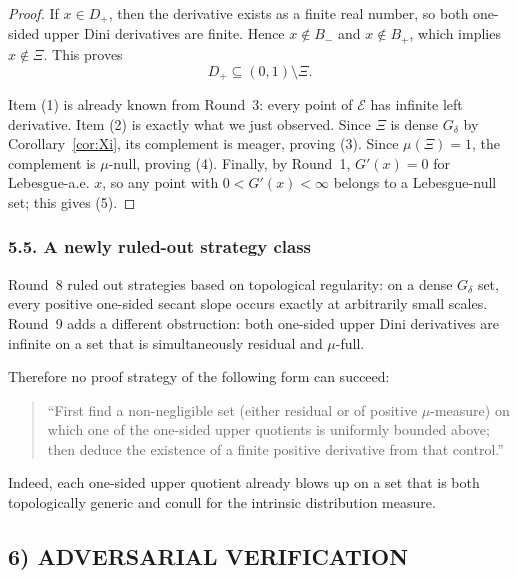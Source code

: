 \begin{proof}
If $x\in D_+$, then the derivative exists as a finite real number, so both one-sided upper Dini derivatives are finite.
Hence $x\notin B_-$ and $x\notin B_+$, which implies $x\notin \Xi$.
This proves
\[
D_+\subseteq (0,1)\setminus\Xi.
\]

Item (1) is already known from Round~3: every point of $\mathcal E$ has infinite left derivative.
Item (2) is exactly what we just observed.
Since $\Xi$ is dense $G_\delta$ by Corollary~\ref{cor:Xi}, its complement is meager, proving (3).
Since $\mu(\Xi)=1$, the complement is $\mu$-null, proving (4).
Finally, by Round~1, $G'(x)=0$ for Lebesgue-a.e. $x$, so any point with $0<G'(x)<\infty$ belongs to a Lebesgue-null set; this gives (5).
\end{proof}

\subsubsection*{5.5. A newly ruled-out strategy class}

Round~8 ruled out strategies based on topological regularity: on a dense $G_\delta$ set, every positive one-sided secant slope occurs exactly at arbitrarily small scales.
Round~9 adds a different obstruction: both one-sided upper Dini derivatives are infinite on a set that is simultaneously residual and $\mu$-full.

Therefore no proof strategy of the following form can succeed:
\begin{quote}
``First find a non-negligible set (either residual or of positive $\mu$-measure) on which one of the one-sided upper quotients is uniformly bounded above; then deduce the existence of a finite positive derivative from that control.''
\end{quote}
Indeed, each one-sided upper quotient already blows up on a set that is both topologically generic and conull for the intrinsic distribution measure.

\subsection{6) ADVERSARIAL VERIFICATION}

